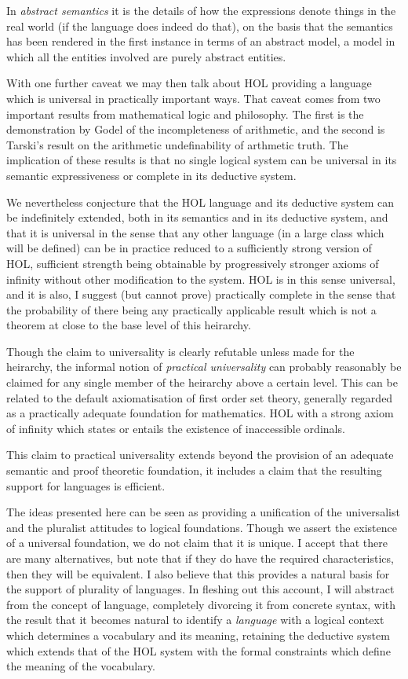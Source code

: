 \documentclass[10pt,titlepage]{book}
\begin{document}
In \emph{abstract semantics} it is the details of how the expressions denote things in the real world (if the language does indeed do that), on the basis that the semantics has been rendered in the first instance in terms of an abstract model, a model in which all the entities involved are purely abstract entities.

With one further caveat we may then talk about HOL providing a language which is universal in practically important ways.
That caveat comes from two important results from mathematical logic and philosophy.
The first is the demonstration by Godel\cite{godel31a} of the incompleteness of arithmetic, and the second is Tarski's result on the arithmetic undefinability of arthmetic truth\cite{tarski31}.
The implication of these results is that no single logical system can be universal in its semantic expressiveness or complete in its deductive system.

We nevertheless conjecture that the HOL language and its deductive system can be indefinitely extended, both in its semantics and in its deductive system, and that it is universal in the sense that any other language (in a large class which will be defined) can be in practice reduced to a sufficiently strong version of HOL, sufficient strength being obtainable by progressively stronger axioms of infinity without other modification to the system.
HOL is in this sense universal, and it is also, I suggest (but cannot prove) practically complete in the sense that the probability of there being any practically applicable result which is not a theorem at close to the base level of this heirarchy.

Though the claim to universality is clearly refutable unless made for the heirarchy, the informal notion of \emph{practical universality} can probably reasonably be claimed for any single member of the heirarchy above a certain level.
This can be related to the default axiomatisation of first order set theory, generally regarded as a practically adequate foundation for mathematics.
HOL with a strong axiom of infinity which states or entails the existence of inaccessible ordinals.

This claim to practical universality extends beyond the provision of an adequate semantic and proof theoretic foundation, it includes a claim that the resulting support for languages is efficient.

The ideas presented here can be seen as providing a unification of the universalist and the pluralist attitudes to logical foundations.
Though we assert the existence of a universal foundation, we do not claim that it is unique.
I accept that there are many alternatives, but note that if they do have the required characteristics, then they will be equivalent.
I also believe that this provides a natural basis for the support of plurality of languages.
In fleshing out this account, I will abstract from the concept of language, completely divorcing it from concrete syntax, with the result that it becomes natural to identify a \emph{language} with a logical context which determines a vocabulary and its meaning, retaining the deductive system which extends that of the HOL system with the formal constraints which define the meaning of the vocabulary.
\end{document}
